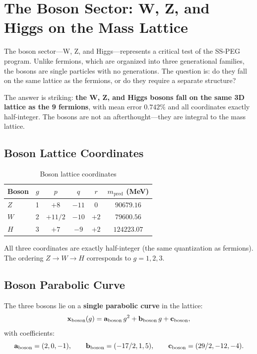 \section{The Boson Sector: W, Z, and Higgs on the Mass Lattice}\label{sec:boson_sector}

The boson sector---W, Z, and Higgs---represents a critical test of the SS-PEG program. Unlike fermions, which are organized into three generational families, the bosons are single particles with no generations. The question is: do they fall on the same lattice as the fermions, or do they require a separate structure?

The answer is striking: \textbf{the W, Z, and Higgs bosons fall on the same 3D lattice as the 9 fermions}, with mean error $0.742\%$ and all coordinates exactly half-integer. The bosons are not an afterthought---they are integral to the mass lattice.

\subsection{Boson Lattice Coordinates}\label{sec:boson_coordinates}

\begin{table}[h]
\centering
\caption{Boson lattice coordinates}
\label{tab:boson_coordinates}
\begin{tabular}{lccccc}
\hline\hline
Boson & $g$ & $p$ & $q$ & $r$ & $m_{\mathrm{pred}}$ (MeV) \\
\hline
$Z$ & 1 & $+8$ & $-11$ & $0$ & $90679.16$ \\
$W$ & 2 & $+11/2$ & $-10$ & $+2$ & $79600.56$ \\
$H$ & 3 & $+7$ & $-9$ & $+2$ & $124223.07$ \\
\hline\hline
\end{tabular}
\end{table}

All three coordinates are exactly half-integer (the same quantization as fermions). The ordering $Z \to W \to H$ corresponds to $g = 1, 2, 3$.

\subsection{Boson Parabolic Curve}\label{sec:boson_parabola}

The three bosons lie on a \textbf{single parabolic curve} in the lattice:
\begin{equation}
\mathbf{x}_{\mathrm{boson}}(g) = \mathbf{a}_{\mathrm{boson}} \, g^2 + \mathbf{b}_{\mathrm{boson}} \, g + \mathbf{c}_{\mathrm{boson}},
\end{equation}
with coefficients:
\begin{equation}
\mathbf{a}_{\mathrm{boson}} = (2, 0, -1), \qquad
\mathbf{b}_{\mathrm{boson}} = (-17/2, 1, 5), \qquad
\mathbf{c}_{\mathrm{boson}} = (29/2, -12, -4).
\end{equation}

